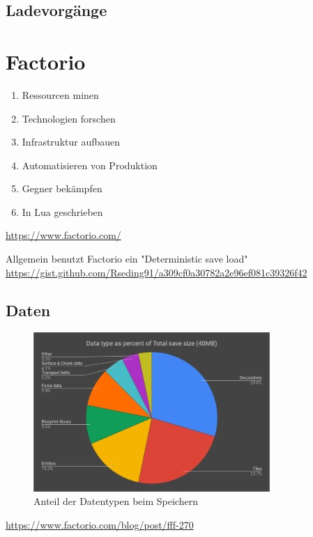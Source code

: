 \subsection{Ladevorgänge}



\section{Factorio}
\begin{enumerate}
    \item Ressourcen minen 
    \item Technologien forschen
    \item Infrastruktur aufbauen
    \item Automatisieren von Produktion
    \item Gegner bekämpfen
    \item In Lua geschrieben
\end{enumerate}
\url{https://www.factorio.com/}

Allgemein benutzt Factorio ein "Deterministic save load"
\url{https://gist.github.com/Rseding91/a309cf0a30782a2e96ef081c39326f42}


\subsection{Daten}

\begin{figure}[htp]
    \centering
    \includegraphics[width=0.8\textwidth]{images/factorio_save_statistic.png}
    \caption{Anteil der Datentypen beim Speichern}
    \label{fig:factorioSaveStatistic}
\end{figure}
\url{https://www.factorio.com/blog/post/fff-270}

